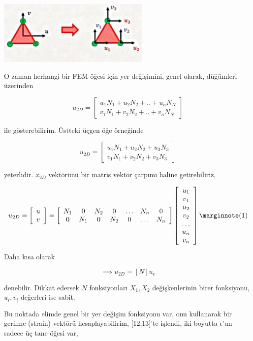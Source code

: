 \documentclass[12pt,fleqn]{article}\usepackage{../../common}
\begin{document}
\includegraphics[width=20em]{compscieng_bpp45fem3_04.jpg}

O zaman herhangi bir FEM öğesi için yer değişimini, genel olarak, düğümleri
üzerinden

$$
u_{2D} = \left[\begin{array}{c}
u_1 N_1 + u_2 N_2 + .. + u_n N_N \\
v_1 N_1 + v_2 N_2 + .. + v_n N_N
\end{array}\right]
$$

ile gösterebilirim. Üstteki üçgen öğe örneğinde 

$$
u_{2D} = \left[\begin{array}{c}
u_1 N_1 + u_2 N_2 + u_3 N_3 \\
v_1 N_1 + v_2 N_2 + v_3 N_3
\end{array}\right]
$$

yeterlidir. $x_{2D}$ vektörünü bir matris vektör çarpımı haline getirebiliriz,

$$
u_{2D} =
\left[\begin{array}{c}
u \\ v
\end{array}\right] = 
\left[\begin{array}{ccccccc}
N_1 & 0 & N_2 & 0 & \dots & N_n & 0 \\
0 & N_1 & 0 & N_2 & 0 & \dots & N_n 
\end{array}\right]
\left[\begin{array}{c}
u_1 \\ v_1 \\ u_2 \\ v_2 \\ \dots \\ u_n \\ v_n
\end{array}\right]
\mlabel{1}
$$

Daha kısa olarak

$$
\implies u_{2D} = [N] u_e
$$

denebilir. Dikkat edersek $N$ fonksiyonları $X_1,X_2$ değişkenlerinin
birer fonksiyonu, $u_i,v_i$ değerleri ise sabit.

Bu noktada elimde genel bir yer değişim fonksiyonu var, onu kullanarak bir
gerilme (strain) vektörü hesaplayabilirim, [12,13]'te işlendi, iki boyutta
$\epsilon$'un sadece üç tane öğesi var,
\end{document}
